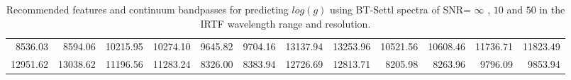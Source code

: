 \begin{table*}
\begin{center}
\begin{tabular}{rrrr | rrrr | rrrr}
     8536.03  & 8594.06  &	10215.95 & 10274.10 & 9645.82  & 9704.16  &	13137.94 & 13253.96 &  10521.56 & 10608.46 &      11736.71 & 11823.49 \\
     12951.62 & 13038.62 &	11196.56 & 11283.24 & 8326.00  & 8383.94  &	12726.69 & 12813.71 &  8205.98  & 8263.96  &      9796.09  & 9853.94  \\ 
   \hline
\end{tabular}
\caption {Recommended features and continuum bandpasses for predicting
  $log(g)$ using BT-Settl spectra of SNR= $\infty $ , $10$ and $50$ in the IRTF
  wavelength range and resolution.} \label{tab:irtf-logg-noisy}
\end{center}
\end{table*}

% 

